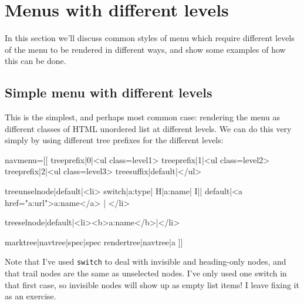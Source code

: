 \section{Menus with different levels}
In this section we'll discuss common styles of menu which require different
levels of the menu to be rendered in different ways, and show some examples of
how this can be done.

\subsection{Simple menu with different levels}
This is the simplest, and perhaps most common case: rendering the menu as different classes
of HTML unordered list at different levels. We can do this very simply by using different tree prefixes
for the different levels:
\begin{MyVerbatim}
navmenu=[[
{{treeprefix|0|<ul class=level1>}}
{{treeprefix|1|<ul class=level2>}}
{{treeprefix|2|<ul class=level3>}}
{{treesuffix|default|</ul>}}

{{treeunselnode|default|<li>
{{switch|{{a:type}}|
    H|{{a:name}}|
    I||
    default|<a href="{{a:url}}">{{a:name}}</a>
    }}|
    </li>
}}

{{treeselnode|default|<li><b>{{a:name}}</b>|</li>}}

{{marktree|{{navtree}}|spec|{{spec}}}}
{{rendertree|{{navtree}}|a}}
]]
\end{MyVerbatim}
Note that I've used \texttt{switch} to deal with invisible and heading-only nodes, and that
trail nodes are the same as unselected nodes. I've only used one switch in that first case,
so invisible nodes will show up as empty list items! I leave fixing it as an exercise.

